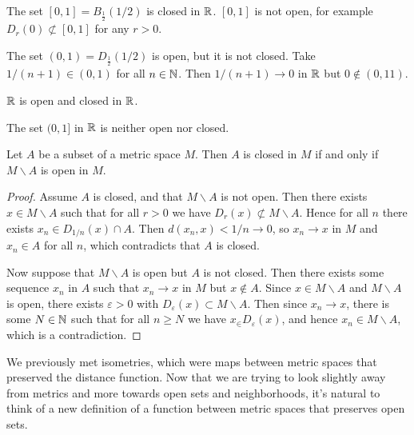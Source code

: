 \documentclass[a4paper]{scrartcl}
\begin{document}
\begin{example}
    The set $[0, 1] = B_{\frac{1}{2}}(1/2)$ is closed in $\mathbb{R}$. $[0, 1]$ is not open, for example $D_r(0) \not \subset [0, 1]$ for any $r > 0$.

    The set $(0, 1) = D_{\frac{1}{2}}(1/2)$ is open, but it is not closed. Take $1/(n + 1) \in (0, 1)$ for all $n \in \mathbb{N}$. Then $1/(n + 1) \rightarrow 0$ in $\mathbb{R}$ but $0 \not \in (0, 11)$.
\end{example}

\begin{example}
   $\mathbb{R}$ is open and closed in $\mathbb{R}$.
\end{example}

\begin{example}
    The set $(0, 1]$ in $\mathbb{R}$ is neither open nor closed.
\end{example}

\begin{lemma}
    Let $A$ be a subset of a metric space $M$. Then $A$ is closed in $M$ if and only if $M \backslash A$ is open in $M$.
\end{lemma}
\begin{proof}
    Assume $A$ is closed, and that $M \backslash A$ is not open. Then there exists $x \in M \backslash A$ such that for all $r > 0$ we have $D_r(x) \not \subset M\backslash A$. 
    Hence for all $n$ there exists $x_n \in D_{1/n}(x) \cap A$. Then $d(x_n, x) < 1/n \rightarrow 0$, so $x_n \rightarrow x$ in $M$ and $x_n \in A$ for all $n$, which contradicts that $A$ is closed.

    Now suppose that $M \backslash A$ is open but $A$ is not closed. Then there exists some sequence $x_n$ in $A$ such that $x_n \rightarrow x$ in $M$ but $x \not \in A$. Since $x \in M \backslash A$ and $M \backslash A$ is open, there exists $\varepsilon > 0$ with $D_\varepsilon(x) \subset M \backslash A$. Then since $x_n \rightarrow x$, there is some $N \in \mathbb{N}$ such that for all $n \geq N$ we have $x_ \in D_{\varepsilon}(x)$, and hence $x_n \in M \backslash A$, which is a contradiction.
\end{proof}

We previously met isometries, which were maps between metric spaces that preserved the distance function. Now that we are trying to look slightly away from metrics and more towards open sets and neighborhoods, it's natural to think of a new definition of a function between metric spaces that preserves open sets.
\end{document}
